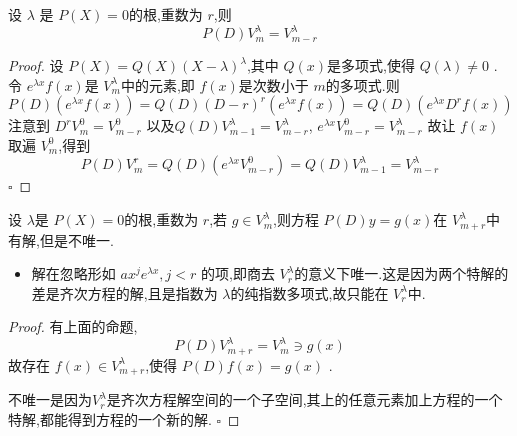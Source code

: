 \documentclass[lang=cn,12pt,color=green,fontset=none]{elegantbook}
\begin{document}
\begin{proposition}
    设 \(  \lambda  \)  是 \(  P\left( X \right)=0   \)的根,重数为 \(  r  \),则 \[
    P\left( D \right)V_{m}^{\lambda}=V_{m-r}^{\lambda} 
    \]   
\end{proposition}
\begin{proof}
    设 \(  P\left( X \right)=Q\left( X \right)  \left( X-\lambda \right)^{\lambda}     \),其中 \(  Q\left( x \right)   \)是多项式,使得 \(  Q\left( \lambda \right)\neq 0   \)   .
    令 \(  e^{\lambda x}f\left( x \right)   \)是 \(  V_{m}^{\lambda}  \)中的元素,即 \(  f\left( x \right)   \)是次数小于 \(  m  \)的多项式.则 \[
    P\left( D \right)\left( e^{\lambda x}f\left( x \right)  \right)= Q\left( D \right)\left( D-r \right)^{r} \left( e^{\lambda x}f\left( x \right)  \right) = Q\left( D \right)\left( e^{\lambda x}D^{r}f\left( x \right)  \right)       
    \]  注意到 \(  D^{r}V_{m}^{0}=V_{m-r}^{0}  \)  以及\(  Q\left( D \right)V_{m-1}^{\lambda}= V_{m-r}^{\lambda}   \), \(  e^{\lambda x}V_{m-r}^{0}= V_{m-r}^{\lambda}  \) 故让 \(  f\left( x \right)   \)取遍 \(  V_{m}^{0}  \),得到    \[
    P\left( D \right)V_{m}^{r} = Q\left( D \right)\left( e^{\lambda x} V_{m-r}^{0} \right)=Q\left( D \right)V_{m-1}^{\lambda} =V_{m-r}^{\lambda}    
    \]
    \hfill $\square$
\end{proof}

\begin{proposition}
    设 \(  \lambda  \)是 \(  P\left( X \right)=0   \)的根,重数为 \(  r  \),若 \(  g \in V_{m}^{\lambda}  \),则方程 \(  P\left( D \right)y=g\left( x \right)    \)在 \(  V_{m+ r}^{\lambda}  \)中有解,但是不唯一.      
\end{proposition}
\begin{remark}
    \begin{itemize}
        \item 解在忽略形如 \(  ax^{j}e^{\lambda x}  ,j<r\) 的项,即商去 \(  V_{r}^{\lambda}  \)的意义下唯一.这是因为两个特解的差是齐次方程的解,且是指数为 \(  \lambda  \)的纯指数多项式,故只能在 \(  V_{r}^{\lambda}  \)中.   
    \end{itemize}
    
\end{remark}
\begin{proof}
    有上面的命题, \[
    P\left( D \right)V_{m+ r}^{\lambda} = V_{m}^{\lambda} \ni g\left( x \right)  
    \]故存在 \(  f\left( x \right) \in V_{m+ r}^{\lambda}   \),使得 \(  P\left( D \right)f\left( x \right) = g\left( x \right)     \)  .

    不唯一是因为\(  V_{r}^{\lambda}  \)是齐次方程解空间的一个子空间,其上的任意元素加上方程的一个特解,都能得到方程的一个新的解. 
    \hfill $\square$
\end{proof}
\end{document}

